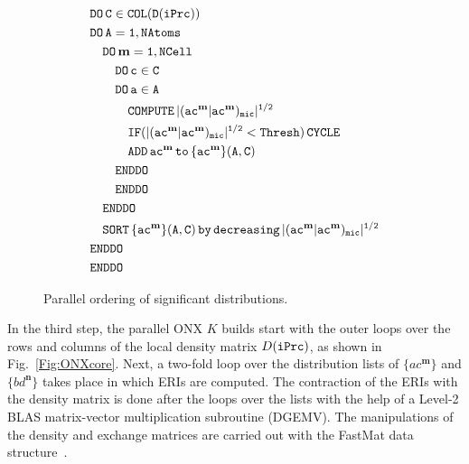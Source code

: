\documentclass[prl,twocolumn,twocolumngrid,superbib]{revtex4}
\begin{document}
\begin{figure}[htbp]
  \centering
  \caption{\protect
    Parallel ordering of significant distributions. 
  }\label{Fig:List}
  \begin{equation*}
    \begin{split}
      &\tt          DO\,C\in COL(D(iPrc))\\
      &\tt          DO\,A=1,NAtoms\\
      &\tt\quad       DO\,\mathbf{m}=1,NCell\\
      &\tt\qquad        DO\,c\in C\\
      &\tt\qquad        DO\,a\in A\\
      &\tt\qquad\quad     COMPUTE\,|(ac^\mathbf{m}|ac^\mathbf{m})_{mic}|^{1/2}\\
      &\tt\qquad\quad     IF(|(ac^\mathbf{m}|ac^\mathbf{m})_{mic}|^{1/2}<{\tt Thresh)\,CYCLE}\\
      &\tt\qquad\quad     ADD\,ac^\mathbf{m}\,{\tt to}\, \{ac^\mathbf{m}\}(A,C)\\
      &\tt\qquad        ENDDO\\
      &\tt\qquad        ENDDO\\
      &\tt\quad       ENDDO\\
      &\tt\quad       SORT\,\{ac^\mathbf{m}\}(A,C)\,by\,decreasing\,|(ac^\mathbf{m}|ac^\mathbf{m})_{mic}|^{1/2}\\
      &\tt         ENDDO\\
      &\tt         ENDDO
    \end{split}
  \end{equation*}
\end{figure}

In the third step, the parallel ONX $K$ builds start with the outer loops over
the rows and columns of the local density matrix $D({\tt iPrc})$, 
as shown in Fig.~\ref{Fig:ONXcore}. Next, a two-fold loop over
the distribution lists of $\{ac^\mathbf{m}\}$ and $\{bd^\mathbf{n}\}$
takes place in which ERIs are computed. The contraction of 
the ERIs with the density matrix is done after the loops over the lists with the help of a 
Level-2 BLAS matrix-vector multiplication subroutine (DGEMV).
The manipulations of the density and exchange matrices are 
carried out with the FastMat data structure~\cite{CGan04B}.
\end{document}
